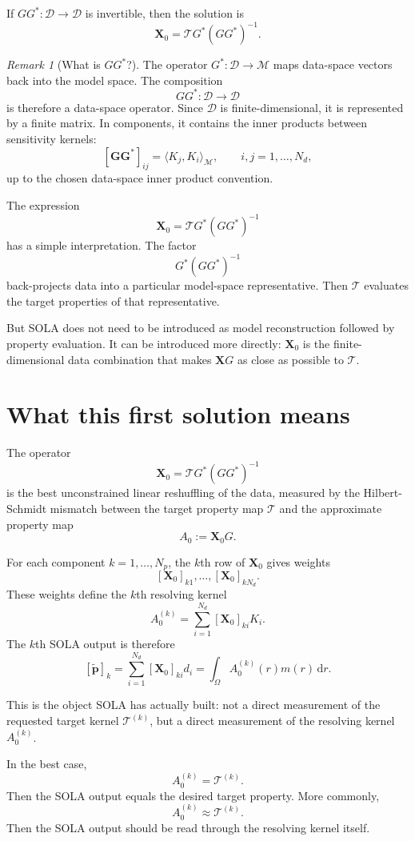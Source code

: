 \documentclass[11pt,openany]{book}
\theoremstyle{definition}
\theoremstyle{remark}
\newtheorem{remark}{Remark}[chapter]
\newcommand{\M}{\mathcal M}
\newcommand{\D}{\mathcal D}
\newcommand{\Tau}{\mathcal{T}}
\newcommand{\dd}{\,\mathrm d}
\begin{document}
If \(GG^*:\D\to\D\) is invertible, then the solution is
\[
  \mathbf X_0
  =
  \Tau G^*(GG^*)^{-1}.
\]

\begin{remark}[What is \(GG^*\)?]
The operator \(G^*:\D\to\M\) maps data-space vectors back into the model space. The
composition
\[
  GG^*:\D\to\D
\]
is therefore a data-space operator. Since \(\D\) is finite-dimensional, it is represented by a
finite matrix. In components, it contains the inner products between sensitivity kernels:
\[
  [\mathbf{GG^*}]_{ij}
  =
  \langle K_j,K_i\rangle_{\M},
  \qquad i,j=1,\dots,N_d,
\]
up to the chosen data-space inner product convention.
\end{remark}

The expression
\[
  \mathbf X_0
  =
  \Tau G^*(GG^*)^{-1}
\]
has a simple interpretation. The factor
\[
  G^*(GG^*)^{-1}
\]
back-projects data into a particular model-space representative. Then \(\Tau\) evaluates the
target properties of that representative.

But SOLA does not need to be introduced as model reconstruction followed by property
evaluation. It can be introduced more directly: \(\mathbf X_0\) is the finite-dimensional data
combination that makes \(\mathbf XG\) as close as possible to \(\Tau\).

\section{What this first solution means}

The operator
\[
  \mathbf X_0
  =
  \Tau G^*(GG^*)^{-1}
\]
is the best unconstrained linear reshuffling of the data, measured by the Hilbert-Schmidt
mismatch between the target property map \(\Tau\) and the approximate property map
\[
  A_0:=\mathbf X_0G.
\]

For each component \(k=1,\dots,N_p\), the \(k\)th row of \(\mathbf X_0\) gives weights
\[
  [\mathbf X_0]_{k1},\dots,[\mathbf X_0]_{kN_d}.
\]
These weights define the \(k\)th resolving kernel
\[
  A_0^{(k)}
  =
  \sum_{i=1}^{N_d}
  [\mathbf X_0]_{ki}K_i.
\]
The \(k\)th SOLA output is therefore
\[
  [\widetilde{\mathbf p}]_k
  =
  \sum_{i=1}^{N_d}
  [\mathbf X_0]_{ki}d_i
  =
  \int_\Omega A_0^{(k)}(r)m(r)\dd r.
\]

This is the object SOLA has actually built: not a direct measurement of the requested target
kernel \(\Tau^{(k)}\), but a direct measurement of the resolving kernel \(A_0^{(k)}\).

In the best case,
\[
  A_0^{(k)}=\Tau^{(k)}.
\]
Then the SOLA output equals the desired target property. More commonly,
\[
  A_0^{(k)}\approx \Tau^{(k)}.
\]
Then the SOLA output should be read through the resolving kernel itself.
\end{document}
